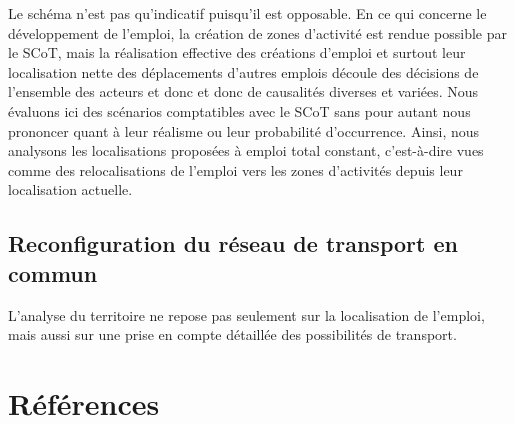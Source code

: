 \documentclass[
  10pt,
  a4paper,
  numbers=noendperiod,
  DIV=9]{scrreprt}
\begin{document}
Le schéma n'est pas qu'indicatif puisqu'il est opposable. En ce qui
concerne le développement de l'emploi, la création de zones d'activité
est rendue possible par le SCoT, mais la réalisation effective des
créations d'emploi et surtout leur localisation nette des déplacements
d'autres emplois découle des décisions de l'ensemble des acteurs et donc
et donc de causalités diverses et variées. Nous évaluons ici des
scénarios comptatibles avec le SCoT sans pour autant nous prononcer
quant à leur réalisme ou leur probabilité d'occurrence. Ainsi, nous
analysons les localisations proposées à emploi total constant,
c'est-à-dire vues comme des relocalisations de l'emploi vers les zones
d'activités depuis leur localisation actuelle.

\hypertarget{reconfiguration-du-ruxe9seau-de-transport-en-commun}{%
\section{Reconfiguration du réseau de transport en
commun}\label{reconfiguration-du-ruxe9seau-de-transport-en-commun}}

L'analyse du territoire ne repose pas seulement sur la localisation de
l'emploi, mais aussi sur une prise en compte détaillée des possibilités
de transport.


\hypertarget{ruxe9fuxe9rences}{%
\chapter*{Références}\label{ruxe9fuxe9rences}}

\end{document}
